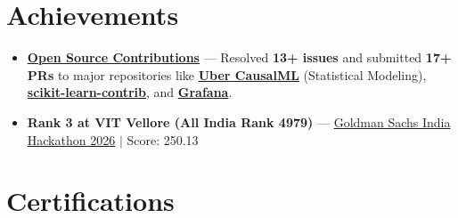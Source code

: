 \documentclass[a4paper,10pt]{article}
\newcommand{\ulink}[2]{\href{#1}{#2}}
\begin{document}
\section{Achievements}
\vspace{2pt}

\begin{itemize}[nosep, leftmargin=1.5em, itemsep=2pt, topsep=2pt]
  \item {\color[HTML]{0A0A0A}\fontsize{11}{14}\selectfont \textbf{\ulink{https://github.com/su-jin1425/My-Open-Source-Contributions}{Open Source Contributions}} --- Resolved \textbf{13+ issues} and submitted \textbf{17+ PRs} to major repositories like \ulink{https://github.com/uber/causalml}{\textbf{Uber CausalML}} (Statistical Modeling), \ulink{https://github.com/scikit-learn-contrib/forest-confidence-interval}{\textbf{scikit-learn-contrib}}, and \ulink{https://github.com/grafana/alloy-scenarios}{\textbf{Grafana}}.}
  \item {\color[HTML]{0A0A0A}\fontsize{11}{14}\selectfont \textbf{Rank 3 at VIT Vellore (All India Rank 4979)} --- \ulink{https://www.hackerrank.com/contests/goldman-sachs-india-hackathon-2026-cs/leaderboard}{Goldman Sachs India Hackathon 2026} $|$ Score: 250.13}
\end{itemize}

\section{Certifications}
\vspace{2pt}
\end{document}
